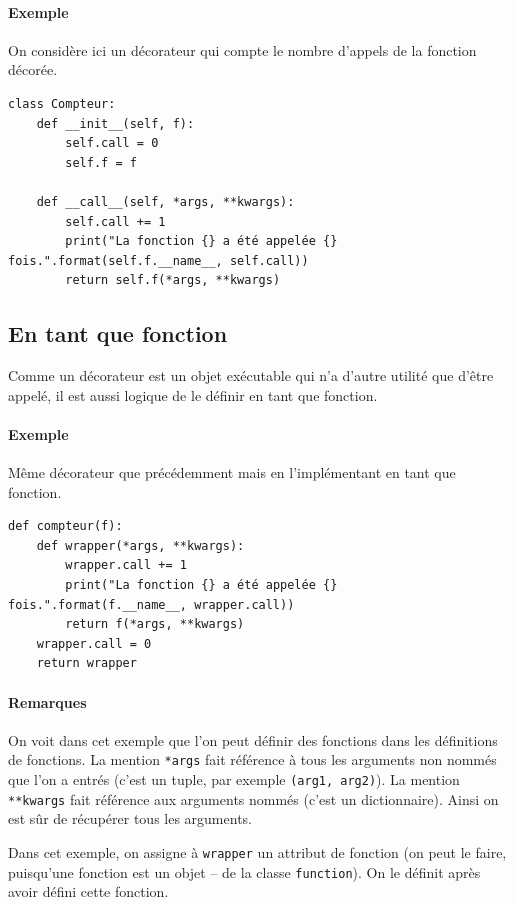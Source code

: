 \documentclass[a4paper, 10pt]{article}
\begin{document}
\paragraph{Exemple} On considère ici un décorateur qui compte le nombre d'appels de la fonction décorée.
\begin{verbatim}
class Compteur:
    def __init__(self, f):
        self.call = 0
        self.f = f

    def __call__(self, *args, **kwargs):
        self.call += 1
        print("La fonction {} a été appelée {} fois.".format(self.f.__name__, self.call))
        return self.f(*args, **kwargs)
\end{verbatim}
\subsection{En tant que fonction}
Comme un décorateur est un objet exécutable qui n'a d'autre utilité que d'être appelé, il est aussi logique de le définir en tant que fonction.

\paragraph{Exemple} Même décorateur que précédemment mais en l'implémentant en tant que fonction.
\begin{verbatim}
def compteur(f):
    def wrapper(*args, **kwargs):
        wrapper.call += 1
        print("La fonction {} a été appelée {} fois.".format(f.__name__, wrapper.call))
        return f(*args, **kwargs)
    wrapper.call = 0
    return wrapper
\end{verbatim}
\paragraph{Remarques} On voit dans cet exemple que l'on peut définir des fonctions dans les définitions de fonctions. La mention \texttt{*args} fait référence à tous les arguments non nommés que l'on a entrés (c'est un tuple, par exemple \texttt{(arg1, arg2)}). La mention \texttt{**kwargs} fait référence aux arguments nommés (c'est un dictionnaire). Ainsi on est sûr de récupérer tous les arguments.\bigskip

Dans cet exemple, on assigne à \texttt{wrapper} un attribut de fonction (on peut le faire, puisqu'une fonction est un objet -- de la classe \texttt{function}). On le définit après avoir défini cette fonction.
\end{document}
